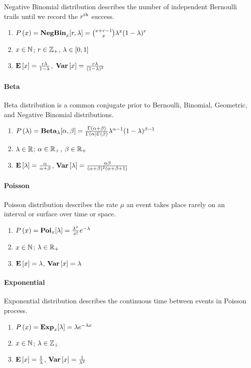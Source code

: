 Negative Binomial distribution describes the number of independent Bernoulli trails until we record the $r^\text{th}$ success.
\begin{enumerate}
	\item $P\left(x\right)=\mathbf{NegBin}_x[r,\lambda]=\binom{x+r-1}{x}\lambda^x(1-\lambda)^r$
	\item $x\in\mathbb{N}$; $r\in\mathbb{Z}_+$, $\lambda\in[0,1]$
	\item $\mathbf{E}\left[x\right]=\frac{r\lambda}{1-\lambda}$, $\mathbf{Var}\left[x\right]=\frac{r\lambda}{(1-\lambda)^2}$
\end{enumerate} 

\paragraph{Beta}

Beta distribution is a common conjugate prior to Bernoulli, Binomial, Geometric, and Negative Binomial distributions.
\begin{enumerate}
	\item $P\left(\lambda\right)=\mathbf{Beta}_\lambda[\alpha,\beta]=\frac{\Gamma(\alpha+\beta)}{\Gamma(\alpha)\Gamma(\beta)}\lambda^{\alpha-1}(1-\lambda)^{\beta-1}$
	\item $\lambda \in \mathbb{R}$; $\alpha \in \mathbb{R}_+$,  $\beta \in \mathbb{R}_+$
	\item $\mathbf{E}\left[\lambda\right]=\frac{\alpha}{\alpha+\beta}$, $\mathbf{Var}\left[\lambda\right]=\frac{\alpha\beta}{(\alpha+\beta)^2(\alpha+\beta+1)}$
\end{enumerate}

\paragraph{Poisson}

Poisson distribution describes the rate $\mu$ an event takes place rarely on an interval or surface over time or space.
\begin{enumerate}
	\item $P\left(x\right)=\mathbf{Poi}_x[\lambda]=\frac{\lambda^x}{x!}e^{-\lambda}$
	\item $x\in\mathbb{N}$; $\lambda\in\mathbb{R}_+$
	\item $\mathbf{E}\left[x\right]=\lambda$, $\mathbf{Var}\left[x\right]=\lambda$
\end{enumerate}

\paragraph{Exponential}

Exponential distribution describes the continuous time between events in Poisson process.
\begin{enumerate}
	\item $P\left(x\right)=\mathbf{Exp}_x[\lambda]=\lambda e^{-\lambda x}$
	\item $x\in\mathbb{N}$; $\lambda\in\mathbb{Z}_+$
	\item $\mathbf{E}\left[x\right]=\frac{1}{\lambda}$, $\mathbf{Var}\left[x\right]=\frac{1}{\lambda^2}$
\end{enumerate}

